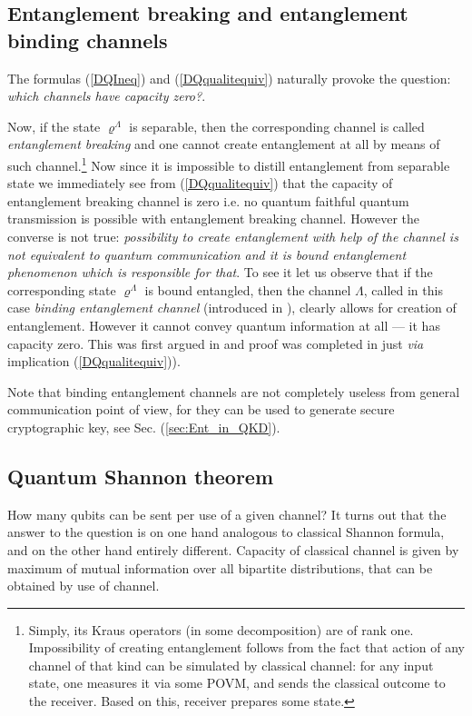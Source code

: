 \documentclass[twocolumn,aps,rmp]{revtex4}
\begin{document}
\subsection{Entanglement breaking and entanglement binding channels}
The formulas (\ref{DQIneq}) and (\ref{DQqualitequiv}) naturally provoke
the question: {\it which channels have capacity zero?}.

Now, if the state $\varrho^{\Lambda}$ is separable, then the
corresponding channel is called {\it entanglement breaking}
\cite{ShorHR-break} and one cannot create entanglement at all  by
means of such channel.\footnote{Simply, its Kraus operators (in
some decomposition) are of rank one. Impossibility of creating
entanglement follows from  the fact that action of any channel of
that kind can be simulated  by classical channel: for any input
state, one measures it via some POVM, and sends the classical
outcome to the receiver. Based on this, receiver prepares some
state.} Now since it is impossible to distill entanglement from
separable state we immediately see from (\ref{DQqualitequiv}) that
the capacity of entanglement breaking channel is zero i.e. no
quantum faithful quantum transmission is possible with entanglement
breaking channel. However the converse is not true: {\it possibility
to create entanglement with help of the channel is not equivalent to
quantum communication and it is bound entanglement phenomenon which
is responsible for that}. To see it let us observe that if  the
corresponding state $\varrho^{\Lambda}$ is bound entangled, then the
channel $\Lambda$, called in this case {\it binding
entanglement channel} (introduced in \cite{bechan,UPB2}), clearly
allows for creation of entanglement. However it cannot convey
quantum information at all --- it has capacity zero.  This was first
argued in \cite{bechan} and proof was completed in \cite{PHCEJP}
just {\it via} implication (\ref{DQqualitequiv})).


Note that binding entanglement channels are not completely useless
from general communication point of view, for they can be
used to generate secure cryptographic key, see Sec.
(\ref{sec:Ent_in_QKD}).

\subsection{Quantum Shannon theorem}
\label{subsec:quantum-shannon-th}
How many qubits can be sent
per use of a given channel? It turns out that the answer to the
question is on one hand analogous to classical Shannon formula, and
on the other hand entirely different. Capacity of classical channel
is given by maximum of mutual information over all bipartite
distributions, that can be obtained by use of channel.
\end{document}
